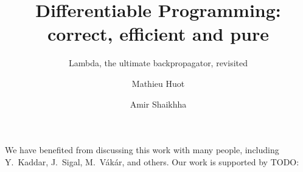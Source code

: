 \documentclass[acmsmall,review,anonymous]{acmart}\settopmatter{printfolios=true,printccs=false,printacmref=false}
\begin{document}
\title{Differentiable Programming: correct, efficient and pure}
\subtitle{Lambda, the ultimate backpropagator, revisited}

\author{Mathieu Huot}

\author{Amir Shaikhha}



\renewcommand{\shortauthors}{Huot, et al.}






\maketitle






\begin{acks}
We have benefited from discussing this work with many people, including Y.~Kaddar, J.~Sigal, M.~V\'ak\'ar, and others. 
Our work is supported by TODO:
\end{acks}


\end{document}
